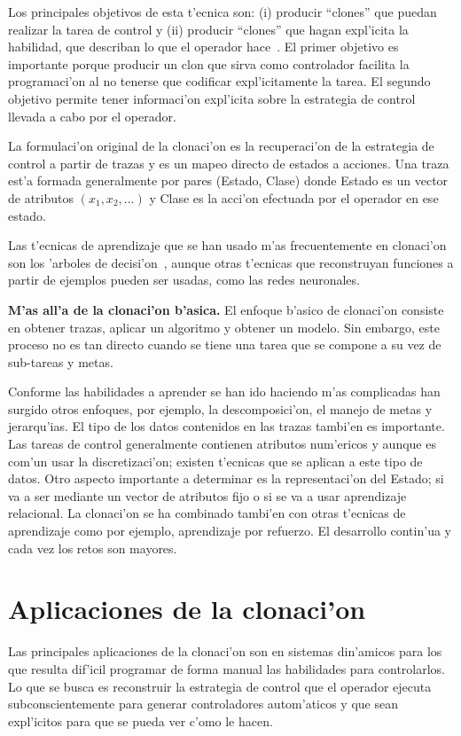 \documentclass[11pt]{article}
\begin{document}
Los principales objetivos de esta t'ecnica son: (i) producir ``clones'' que puedan realizar la tarea de control y (ii) producir ``clones'' que hagan expl'icita la habilidad, que describan lo que el operador hace~\cite{modellingskills}. El primer objetivo es importante porque producir un clon que sirva como controlador facilita la programaci'on al no tenerse que codificar expl'icitamente la tarea. El segundo objetivo permite tener informaci'on expl'icita sobre la estrategia de control llevada a cabo por el operador. 

La formulaci'on original de la \textsf{clonaci'on} es la recuperaci'on de la estrategia de control a partir de trazas y es un mapeo directo de estados a acciones. Una traza est'a formada generalmente por pares (Estado, Clase) donde Estado es un vector de atributos $(x_1,x_2,...)$ y Clase es la acci'on efectuada por el operador en ese estado. 

Las t'ecnicas de aprendizaje que se han usado m'as frecuentemente en \textsf{clonaci'on} son los \textsf{'arboles de decisi'on}~\cite{quinlan1986}, aunque otras t'ecnicas que reconstruyan funciones a partir de ejemplos pueden ser usadas, como las redes neuronales.

\medskip
\noindent

\textbf{M'as all'a de la clonaci'on b'asica.}
El enfoque b'asico de clonaci'on consiste en obtener trazas, aplicar un algoritmo y obtener un modelo. Sin embargo, este proceso no es tan directo cuando se tiene una tarea que se compone a su vez de sub-tareas y metas.

Conforme las habilidades a aprender se han ido haciendo m'as complicadas han surgido otros enfoques, por ejemplo, la descomposici'on, el manejo de metas y jerarqu'ias. El tipo de los datos contenidos en las trazas tambi'en es importante. Las tareas de control generalmente contienen atributos num'ericos y aunque es com'un usar la discretizaci'on; existen t'ecnicas que se aplican a este tipo de datos. Otro aspecto importante a determinar es la representaci'on del Estado; si va a ser mediante un vector de atributos fijo o si se va a usar aprendizaje relacional. La clonaci'on se ha combinado tambi'en con otras t'ecnicas de aprendizaje como por ejemplo, aprendizaje por refuerzo. El desarrollo contin'ua y cada vez los retos son mayores.


\section{Aplicaciones de la clonaci'on}
Las principales aplicaciones de la clonaci'on son en sistemas din'amicos para los que resulta dif'icil programar de forma manual las habilidades para controlarlos. Lo que se busca es reconstruir la estrategia de control que el operador ejecuta subconscientemente para generar controladores autom'aticos y que sean expl'icitos para que se pueda ver c'omo le hacen.
\end{document}

